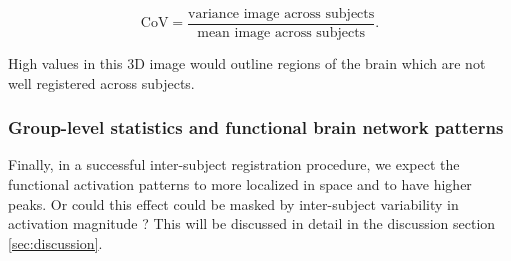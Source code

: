 \begin{equation}
  \text{CoV} = \frac{\text{variance image across subjects}}{\text{mean image across subjects}}.
\end{equation}

High values in this 3D image would outline regions of the brain which are not well registered across subjects.




\subsubsection{Group-level statistics and functional brain network patterns}
Finally, in a successful inter-subject registration procedure, we
expect the functional activation patterns to more localized in space
and to have higher peaks. Or could this effect could be
masked by inter-subject variability in activation magnitude ?
This will be discussed in detail in the discussion section \ref{sec:discussion}.

